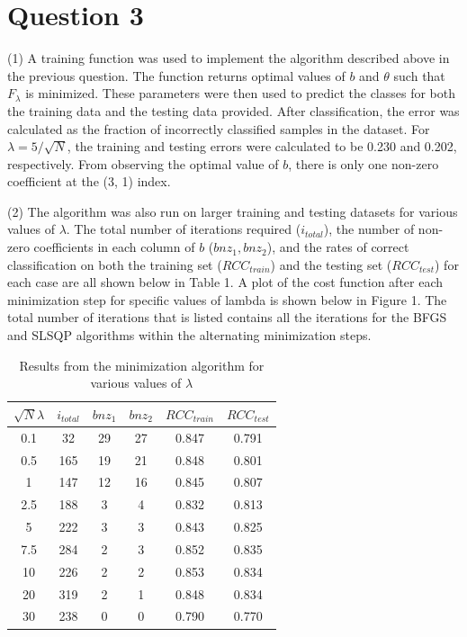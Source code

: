 \section*{Question 3}
(1) A training function was used to implement the algorithm described above in the previous question. The function returns optimal values of $b$ and $\theta$ such that $F_{\lambda}$ is minimized. These parameters were then used to predict the classes for both the training data and the testing data provided. After classification, the error was calculated as the fraction of incorrectly classified samples in the dataset. For $\lambda = 5/\sqrt{N}$, the training and testing errors were calculated to be 0.230 and 0.202, respectively. From observing the optimal value of $b$, there is only one non-zero coefficient at the (3, 1) index. 

(2) The algorithm was also run on larger training and testing datasets for various values of $\lambda$. The total number of iterations required ($i_{total}$), the number of non-zero coefficients in each column of $b$ ($bnz_{1}, bnz_{2}$), and the rates of correct classification on both the training set ($RCC_{train}$) and the testing set ($RCC_{test}$) for each case are all shown below in Table 1. A plot of the cost function after each minimization step for specific values of lambda is shown below in Figure 1. The total number of iterations that is listed contains all the iterations for the BFGS and SLSQP algorithms within the alternating minimization steps.
\begin{table}
\centering
 \begin{tabular}{||c c c c c c||} 
 \hline
 $\sqrt{N}\lambda$ & $i_{total}$ & $bnz_{1}$ & $bnz_{2}$ & $RCC_{train}$ & $RCC_{test}$ \\ [0.5ex] 
 \hline\hline
0.1 & 32 & 29 & 27 & 0.847 & 0.791 \\
0.5 & 165 & 19 & 21 & 0.848 & 0.801 \\
1 & 147 & 12 & 16 & 0.845 & 0.807 \\
2.5 & 188 & 3 & 4 & 0.832 & 0.813 \\
5 & 222 & 3 & 3 & 0.843 & 0.825 \\
7.5 & 284 & 2 & 3 & 0.852 & 0.835 \\
10 & 226 & 2 & 2 & 0.853 & 0.834 \\
20 & 319 & 2 & 1 & 0.848 & 0.834 \\
30 & 238 & 0 & 0 & 0.790 & 0.770 \\ [0.5ex] 
 \hline
 \end{tabular}
 \caption{Results from the minimization algorithm for various values of $\lambda$}
\label{table:1}
\end{table}
